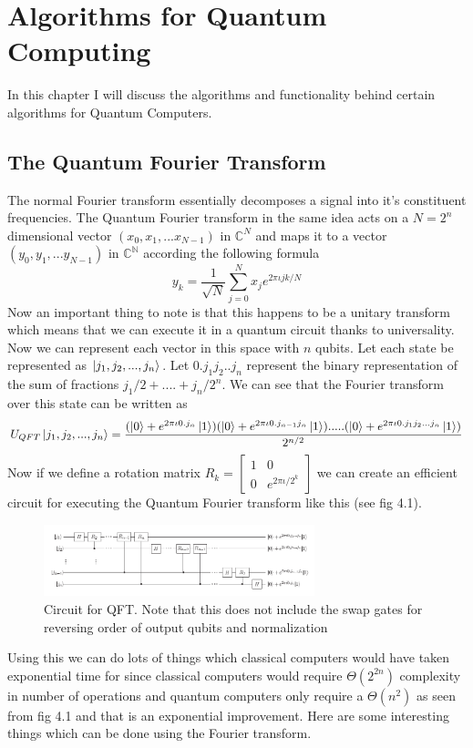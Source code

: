 \documentclass{report}
\begin{document}
\chapter{Algorithms for Quantum Computing}
In this chapter I will discuss the algorithms and functionality behind certain algorithms for Quantum Computers.

\section{The Quantum Fourier Transform}
The normal Fourier transform essentially decomposes a signal into it's constituent frequencies. The Quantum Fourier transform in the same idea acts on a $N = 2^n$ dimensional vector $(x_0,x_1,...x_{N-1})$ in $\mathbb{C}^{N}$ and maps it to a vector $(y_0,y_1,...y_{N-1})$ in $\mathbb{C^N}$ according the following formula
$$y_k = \dfrac{1}{\sqrt{N}}\sum_{j = 0}^{N}x_{j}e^{2\pi\iota{jk/N}}$$
Now an important thing to note is that this happens to be a unitary transform which means that we can execute it in a quantum circuit thanks to universality.
Now we can represent each vector in this space with $n$ qubits. Let each state be represented as $\ket{j_1,j_2,...,j_n}$. Let $0.j_1j_2..j_n$ represent the binary representation of the sum of fractions ${j_1}/{2} + .... + {j_n}/{2^n}$. We can see that the Fourier transform over this state can be written as
\begin{equation}U_{QFT}\ket{j_1,j_2,...,j_n} = \dfrac{(\ket{0} + e^{2\pi\iota0.j_n}\ket{1})(\ket{0} + e^{2\pi\iota0.j_{n-1}j_{n}}\ket{1}).....(\ket{0} + e^{2\pi\iota0.j_{1}j_{2}...j_{n}}\ket{1})}{2^{n/2}}\end{equation}
Now if we define a rotation matrix $R_k = \begin{bmatrix}1 & 0\\0 & e^{2\pi\iota/2^k}\end{bmatrix}$ we can create an efficient circuit for executing the Quantum Fourier transform like this (see fig 4.1).
\begin{figure}[ht]
    \centering
    \includegraphics[width = 0.7\textwidth]{images/QFT circuit.png}
    \caption{Circuit for QFT. Note that this does not include the swap gates for reversing order of output qubits and normalization}
\end{figure}
Using this we can do lots of things which classical computers would have taken exponential time for since classical computers would require $\Theta(2^{2n})$ complexity in number of operations and quantum computers only require a $\Theta{(n^2)}$ as seen from fig 4.1 and that is an exponential improvement. Here are some interesting things which can be done using the Fourier transform.
\end{document}
